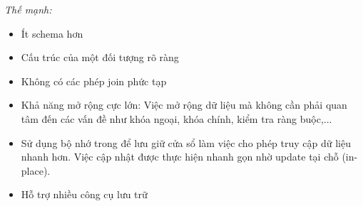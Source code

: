 \textit{Thế mạnh:}
\begin{itemize}
    \item Ít schema hơn
    \item Cấu trúc của một đối tượng rõ ràng
    \item Không có các phép join phức tạp
    \item Khả năng mở rộng cực lớn: Việc mở rộng dữ liệu mà không cần phải quan tâm đến các vấn đề như khóa ngoại, khóa chính, kiểm tra ràng buộc,...
    \item Sử dụng bộ nhớ trong để lưu giữ cửa sổ làm việc cho phép truy cập dữ liệu nhanh hơn. Việc cập nhật được thực hiện nhanh gọn nhờ update tại chỗ (in-place).
    \item Hỗ trợ nhiều công cụ lưu trữ
\end{itemize}


